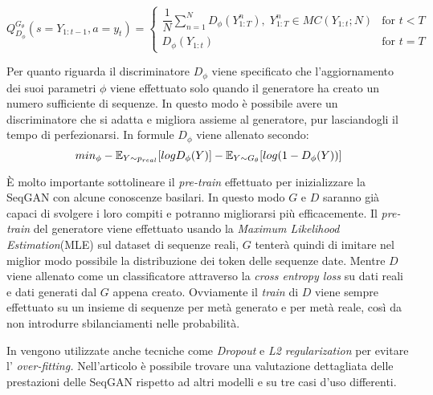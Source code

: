 $$
Q_{D_\phi}^{G_\theta}
( s = Y_{1:t-1} ,
a = y_t)
=
\left\{\begin{array}{lr}
    \dfrac{1}{N} \sum_{n=1}^N D_\phi (Y_{1:T}^n) ,\; Y_{1:T}^n \in MC(Y_{1:t};N)
      & \textrm{for } t < T \\

    D_\phi (Y_{1:t}) & \textrm{for } t = T

\end{array}\right.
$$

Per quanto riguarda il discriminatore $D_\phi$ viene specificato che l'aggiornamento dei suoi parametri $\phi$ viene effettuato solo quando il generatore ha creato un numero sufficiente di sequenze.
In questo modo è possibile avere un discriminatore che si adatta e migliora assieme al generatore, pur lasciandogli il tempo di perfezionarsi.
In formule $D_\phi$ viene allenato secondo:
$$
min_\phi
- \mathbb{E}_{Y \sim p_{real}} [ log D_\phi (Y) ]
- \mathbb{E}_{Y \sim G_\theta} [ log ( 1 - D_\phi(Y))]
$$

È molto importante sottolineare il \emph{pre-train} effettuato per inizializzare la SeqGAN con alcune conoscenze basilari.
In questo modo $G$ e $D$ saranno già capaci di svolgere i loro compiti e potranno migliorarsi più efficacemente.
Il \emph{pre-train} del generatore viene effettuato usando la \emph{Maximum Likelihood Estimation}(MLE) sul dataset di sequenze reali, $G$ tenterà quindi di imitare nel miglior modo possibile la distribuzione dei token delle sequenze date.
Mentre $D$ viene allenato come un classificatore attraverso la \emph{cross entropy loss} 
su dati reali e dati generati dal $G$ appena creato.
Ovviamente il \emph{train} di $D$ viene sempre effettuato su un insieme di sequenze per metà generato e per metà reale, così da non introdurre sbilanciamenti nelle probabilità.

In \cite{SeqGAN} vengono utilizzate anche tecniche come \emph{Dropout} e \emph{L2 regularization} per evitare l' \emph{over-fitting.} 
Nell'articolo è possibile trovare una valutazione dettagliata delle prestazioni delle SeqGAN rispetto ad altri modelli e su tre casi d'uso differenti.



